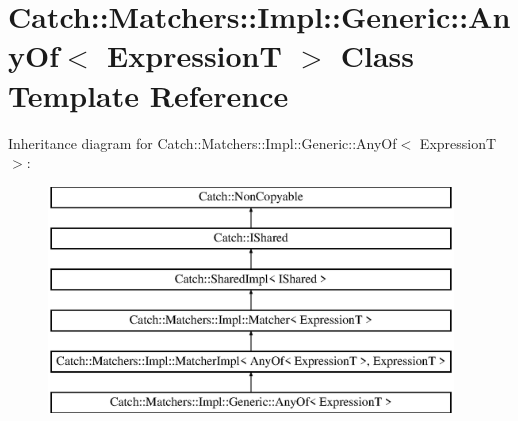 \hypertarget{classCatch_1_1Matchers_1_1Impl_1_1Generic_1_1AnyOf}{}\section{Catch\+:\+:Matchers\+:\+:Impl\+:\+:Generic\+:\+:Any\+Of$<$ ExpressionT $>$ Class Template Reference}
\label{classCatch_1_1Matchers_1_1Impl_1_1Generic_1_1AnyOf}
Inheritance diagram for Catch\+:\+:Matchers\+:\+:Impl\+:\+:Generic\+:\+:Any\+Of$<$ ExpressionT $>$\+:\begin{figure}[H]
\begin{center}
\leavevmode
\includegraphics[height=6.000000cm]{classCatch_1_1Matchers_1_1Impl_1_1Generic_1_1AnyOf}
\end{center}
\end{figure}
